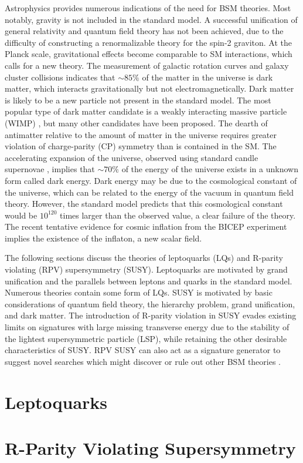 Astrophysics provides numerous indications of the need for BSM theories. Most notably, gravity is not included in the standard model. A successful unification of general relativity and quantum field theory has not been achieved, due to the difficulty of constructing a renormalizable theory for the spin-2 graviton. At the Planck scale, gravitational effects become comparable to SM interactions, which calls for a new theory. The measurement of galactic rotation curves and galaxy cluster collisions \cite{BulletCluster} indicates that ${\sim} 85\%$ of the matter in the universe is dark matter, which interacts gravitationally but not electromagnetically. Dark matter is likely to be a new particle not present in the standard model. The most popular type of dark matter candidate is a weakly interacting massive particle (WIMP) \cite{Morrissey20121}, but many other candidates have been proposed. The dearth of antimatter relative to the amount of matter in the universe requires greater violation of charge-parity (CP) symmetry than is contained in the SM. The accelerating expansion of the universe, observed using standard candle supernovae \cite{Supernova98,Supernova99}, implies that ${\sim} 70\%$ of the energy of the universe exists in a unknown form called dark energy. Dark energy may be due to the cosmological constant of the universe, which can be related to the energy of the vacuum in quantum field theory. However, the standard model predicts that this cosmological constant would be $10^{120}$ times larger than the observed value, a clear failure of the theory. The recent tentative evidence for cosmic inflation from the BICEP experiment \cite{BICEP} implies the existence of the inflaton, a new scalar field.

The following sections discuss the theories of leptoquarks (LQs) and R-parity violating (RPV) supersymmetry (SUSY). Leptoquarks are motivated by grand unification and the parallels between leptons and quarks in the standard model. Numerous theories contain some form of LQs. SUSY is motivated by basic considerations of quantum field theory, the hierarchy problem, grand unification, and dark matter. The introduction of R-parity violation in SUSY evades existing limits on signatures with large missing transverse energy due to the stability of the lightest supersymmetric particle (LSP), while retaining the other desirable characteristics of SUSY. RPV SUSY can also act as a signature generator to suggest novel searches which might discover or rule out other BSM theories \cite{EvansSigGen}.

\section{Leptoquarks}

\section{R-Parity Violating Supersymmetry}
